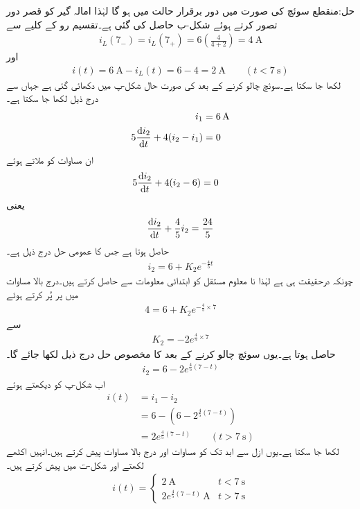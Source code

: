 حل:منقطع سوئچ کی صورت میں دور برقرار حالت میں ہو گا لہٰذا امالہ گیر کو قصر دور تصور کرتے ہوئے شکل-ب حاصل کی گئی ہے۔تقسیم رو کے کلیے سے
\begin{align*}
i_L(7_-)=i_L(7_+)=6\left(\frac{4}{4+2}\right)=\SI{4}{\ampere}
\end{align*}
اور
\begin{align}\label{مساوات_عارضی_امالہ_گیر_سات_سیکنڈ_الف}
i(t)=\SI{6}{\ampere}-i_L(t)=6-4=\SI{2}{\ampere} \quad \quad (t<\SI{7}{\second})
\end{align}
لکھا جا سکتا ہے۔سوئچ چالو کرنے کے بعد کی صورت حال شکل-پ میں دکھائی گئی ہے جہاں سے درج ذیل لکھا جا سکتا ہے۔
\begin{align*}
i_1&=\SI{6}{\ampere}\\
5\frac{\dif i_2}{\dif t}+4(i_2-i_1)&=0
\end{align*}
ان مساوات کو ملاتے ہوئے
\begin{align*}
5\frac{\dif i_2}{\dif t}+4(i_2-6)&=0
\end{align*}
یعنی
\begin{align*}
\frac{\dif i_2}{\dif t}+\frac{4}{5} i_2=\frac{24}{5}
\end{align*}
حاصل ہوتا ہے جس کا عمومی حل درج ذیل ہے۔
\begin{align*}
i_2=6+K_2e^{-\frac{4}{5}t}
\end{align*}
چونکہ  درحقیقت  ہی ہے لہٰذا نا معلوم مستقل  کو ابتدائی معلومات سے حاصل کرتے ہیں۔درج بالا مساوات میں   پر  پُر کرتے ہوئے 
\begin{align*}
4=6+K_2e^{-\frac{4}{5}\times 7}
\end{align*} 
سے
\begin{align*}
K_2=-2e^{\frac{4}{5}\times 7}
\end{align*}
حاصل ہوتا ہے۔یوں سوئچ چالو کرنے کے بعد  کا مخصوص حل درج ذیل لکھا جائے گا۔
\begin{align*}
i_2=6-2e^{\frac{4}{5}(7-t)}
\end{align*}
اب شکل-پ کو دیکھتے ہوئے
\begin{align*}
i(t)&=i_1-i_2\\
&=6-\left(6-2^{\frac{4}{5}(7-t)}\right)\\
&=2e^{\frac{4}{5}(7-t)}\quad \quad (t>\SI{7}{\second})
\end{align*}
لکھا جا سکتا ہے۔یوں ازل سے ابد تک  کو مساوات  اور درج بالا مساوات  پیش کرتے ہیں۔انہیں اکٹھے لکھتے  اور شکل-ت میں پیش کرتے ہیں۔
\begin{align}
i(t)=
\begin{cases}
\SI{2}{\ampere} & t<\SI{7}{\second}\\
2e^{\frac{4}{5}(7-t)} \, \si{\ampere} & t>\SI{7}{\second}
\end{cases}
\end{align}
